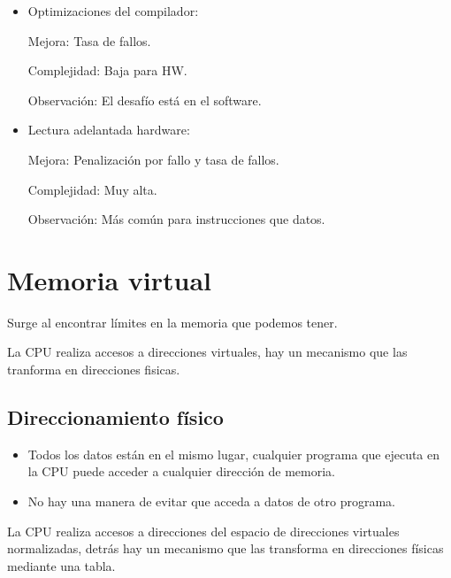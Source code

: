 \documentclass[12pt, twoside, openright]{report} %
\begin{document}
\begin{itemize}
    \item Optimizaciones del compilador:

Mejora: Tasa de fallos.

Complejidad: Baja para HW.

Observación: El desafío está en el software.

    \item Lectura adelantada hardware:

Mejora: Penalización por fallo y tasa de fallos.

Complejidad: Muy alta.

Observación: Más común para instrucciones que datos.
  \end{itemize}


\section{Memoria virtual}
\begin{figure}[H]
	{\def\svgwidth{.8\textwidth}
    }
\end{figure}


    Surge al encontrar límites en la memoria que podemos tener.

    La CPU realiza accesos a direcciones virtuales, hay un mecanismo que las tranforma en direcciones fisicas.

  \subsection{Direccionamiento físico}
  \begin{figure}[H]
    {\def\svgwidth{.8\textwidth}
      }
  \end{figure}
  \begin{itemize}
    \item Todos los datos están en el mismo lugar, cualquier programa que ejecuta en la CPU puede acceder a cualquier dirección de memoria.
    \item
    No hay una manera de evitar que acceda a datos de otro programa.
  \end{itemize}

  La CPU realiza accesos a direcciones del espacio de direcciones
  virtuales normalizadas, detrás hay un mecanismo que las transforma
  en direcciones físicas mediante una tabla.
\end{document}
